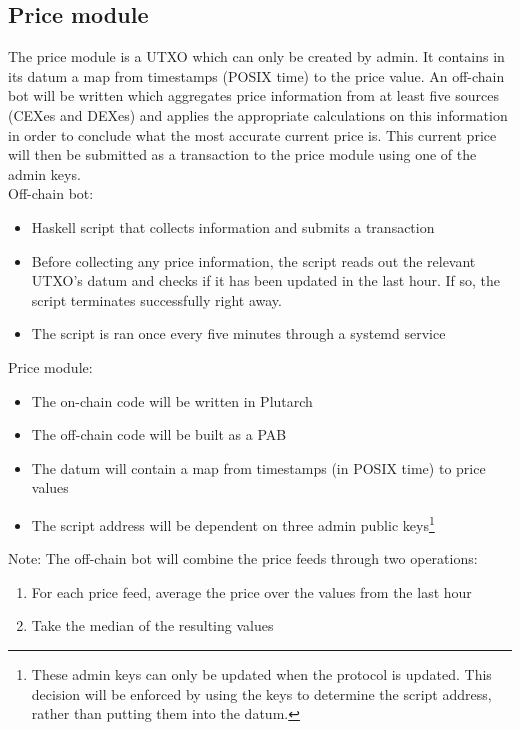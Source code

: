 \documentclass{article} %
\begin{document}
\subsection{Price module}

The price module is a UTXO which can only be created by admin.
It contains in its datum a map from timestamps (POSIX time) to the price value.
An off-chain bot will be written which aggregates price information from at
least five sources (CEXes and DEXes) and applies the appropriate calculations on
this information in order to conclude what the most accurate current price is.
This current price will then be submitted as a transaction to the price module
using one of the admin keys. \\

Off-chain bot:
\begin{itemize}
  \item Haskell script that collects information and submits a transaction
  \item Before collecting any price information, the script reads out the
    relevant UTXO's datum and checks if it has been updated in the last hour. If
    so, the script terminates successfully right away.
  \item The script is ran once every five minutes through a systemd service
\end{itemize}

Price module:
\begin{itemize}
  \item The on-chain code will be written in Plutarch
  \item The off-chain code will be built as a PAB
  \item The datum will contain a map from timestamps (in POSIX time) to price
    values
  \item The script address will be dependent on three admin public
    keys\footnote{
      These admin keys can only be updated when the protocol is updated.
      This decision will be enforced by using the keys to determine the script
      address, rather than putting them into the datum.
    }
\end{itemize}

Note: The off-chain bot will combine the price feeds through two operations:
\begin{enumerate}
  \item For each price feed, average the price over the values from the last
    hour
  \item Take the median of the resulting values
\end{enumerate}
\end{document}

